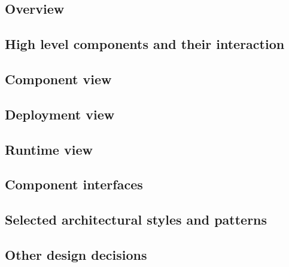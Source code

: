 \subsection{Overview}

\subsection{High level components and their interaction}
	
\subsection{Component view}
	
\subsection{Deployment view}
	
\subsection{Runtime view}
	
\subsection{Component interfaces}
	
\subsection{Selected architectural styles and patterns}
	
\subsection{Other design decisions}
